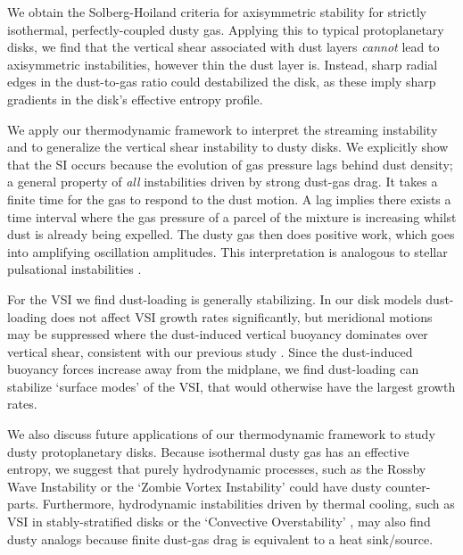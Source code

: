 We obtain the Solberg-Hoiland criteria for axisymmetric stability for
strictly isothermal, perfectly-coupled dusty gas.  
Applying this to typical protoplanetary disks, we find that 
the vertical shear associated with dust 
 layers \emph{cannot} lead to axisymmetric  
  instabilities, however thin the dust layer is.   
Instead, sharp radial  edges in the dust-to-gas ratio could destabilized the
disk, as these imply sharp gradients in the disk's effective entropy
profile. %

We  apply our thermodynamic framework to interpret
the streaming instability \citep[SI, ][]{youdin05a,jacquet11} and to generalize the vertical shear
instability \citep[VSI, ][]{nelson13,lin15} to dusty disks. We
explicitly show that the SI occurs because the evolution of gas
pressure lags behind  dust density; a general property of \emph{all}
instabilities driven by strong dust-gas drag. 
It takes a finite time for the gas to respond to
the dust motion. A lag implies there exists a time interval where 
the gas pressure of a parcel of the mixture is increasing whilst dust is already being expelled.  
The dusty gas then does positive work, which goes into amplifying
oscillation amplitudes. This interpretation is analogous to stellar pulsational
instabilities \citep{cox67}. 

For the VSI we find dust-loading is generally stabilizing. In our disk models 
dust-loading does not affect VSI growth rates significantly, but
meridional motions may be suppressed where the dust-induced
vertical buoyancy dominates over vertical shear, consistent with our
previous study \citep{lin15}. Since the dust-induced buoyancy forces increase away from the midplane, we find dust-loading can stabilize `surface modes' of the VSI, that would otherwise have the largest growth rates.  

We also discuss future applications of our thermodynamic framework to 
study dusty protoplanetary disks. Because isothermal dusty gas has an
effective entropy, we suggest that purely hydrodynamic processes, such
as the Rossby Wave Instability \citep{li00} or the `Zombie Vortex
Instability' \citep{marcus15} could have dusty counter-parts.   
Furthermore, hydrodynamic instabilities driven by thermal cooling, such as VSI in
stably-stratified disks \citep{lin15} or the `Convective
Overstability' \citep{klahr14, lyra14},  may also find dusty analogs 
because finite dust-gas drag is equivalent to a heat sink/source. 





